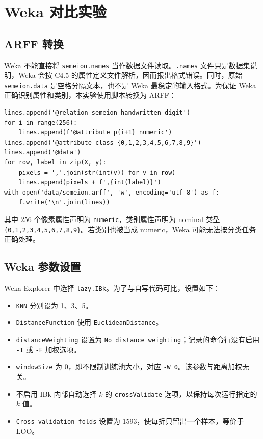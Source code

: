 \documentclass[UTF8,zihao=-4]{ctexart}
\begin{document}
\section{Weka 对比实验}

\subsection{ARFF 转换}

Weka 不能直接将 \texttt{semeion.names} 当作数据文件读取。\texttt{.names} 文件只是数据集说明，Weka 会按 C4.5 的属性定义文件解析，因而报出格式错误。同时，原始 \texttt{semeion.data} 是空格分隔文本，也不是 Weka 最稳定的输入格式。为保证 Weka 正确识别属性和类别，本实验使用脚本转换为 ARFF：

\begin{lstlisting}[style=pythonstyle,caption={ARFF 转换的关键结构}]
lines.append('@relation semeion_handwritten_digit')
for i in range(256):
    lines.append(f'@attribute p{i+1} numeric')
lines.append('@attribute class {0,1,2,3,4,5,6,7,8,9}')
lines.append('@data')
for row, label in zip(X, y):
    pixels = ','.join(str(int(v)) for v in row)
    lines.append(pixels + f',{int(label)}')
with open('data/semeion.arff', 'w', encoding='utf-8') as f:
    f.write('\n'.join(lines))
\end{lstlisting}

其中 256 个像素属性声明为 \texttt{numeric}，类别属性声明为 nominal 类型 \texttt{\{0,1,2,3,4,5,6,7,8,9\}}。若类别也被当成 numeric，Weka 可能无法按分类任务正确处理。

\subsection{Weka 参数设置}

Weka Explorer 中选择 \texttt{lazy.IBk}。为了与自写代码可比，设置如下：

\begin{itemize}
  \item \texttt{KNN} 分别设为 1、3、5。
  \item \texttt{DistanceFunction} 使用 \texttt{EuclideanDistance}。
  \item \texttt{distanceWeighting} 设置为 \texttt{No distance weighting}；记录的命令行没有启用 \texttt{-I} 或 \texttt{-F} 加权选项。
  \item \texttt{windowSize} 为 0，即不限制训练池大小，对应 \texttt{-W 0}。该参数与距离加权无关。
  \item 不启用 IBk 内部自动选择 $k$ 的 \texttt{crossValidate} 选项，以保持每次运行指定的 $k$ 值。
  \item \texttt{Cross-validation folds} 设置为 1593，使每折只留出一个样本，等价于 LOO。
\end{itemize}
\end{document}
